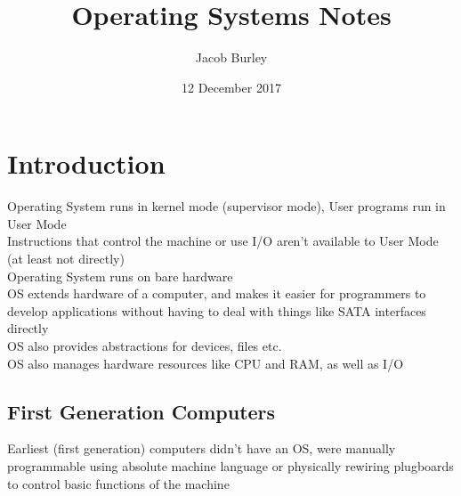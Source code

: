 \documentclass{article}
\title{Operating Systems Notes}
\author{Jacob Burley} %
\date{12 December 2017}
\begin{document}

\maketitle
\section{Introduction}
Operating System runs in kernel mode (supervisor mode), User programs run in User Mode
\\Instructions that control the machine or use I/O aren't available to User Mode (at least not directly)
\\Operating System runs on bare hardware
\\OS extends hardware of a computer, and makes it easier for programmers to develop applications without having to deal with things like SATA interfaces directly
\\OS also provides abstractions for devices, files etc.
\\OS also manages hardware resources like CPU and RAM, as well as I/O
\subsection*{First Generation Computers}
Earliest (first generation) computers didn't have an OS, were manually programmable using absolute machine language or physically rewiring plugboards to control basic functions of the machine
\end{document}
